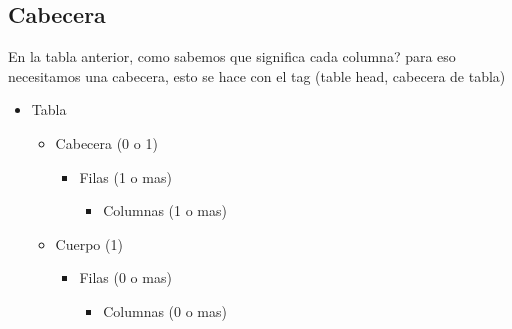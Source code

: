 \documentclass[letterpaper,10pt,spanish]{sphinxmanual}
\begin{document}
\subsection{Cabecera}
\label{\detokenize{hay-tabla:cabecera}}
En la tabla anterior, como sabemos que significa cada columna? para eso
necesitamos una cabecera, esto se hace con el tag  (table head, cabecera
de tabla)
\begin{itemize}
\item {} 
Tabla
\begin{itemize}
\item {} 
Cabecera (0 o 1)
\begin{itemize}
\item {} 
Filas (1 o mas)
\begin{itemize}
\item {} 
Columnas (1 o mas)

\end{itemize}

\end{itemize}

\item {} 
Cuerpo (1)
\begin{itemize}
\item {} 
Filas (0 o mas)
\begin{itemize}
\item {} 
Columnas (0 o mas)

\end{itemize}

\end{itemize}

\end{itemize}

\end{itemize}
\end{document}
